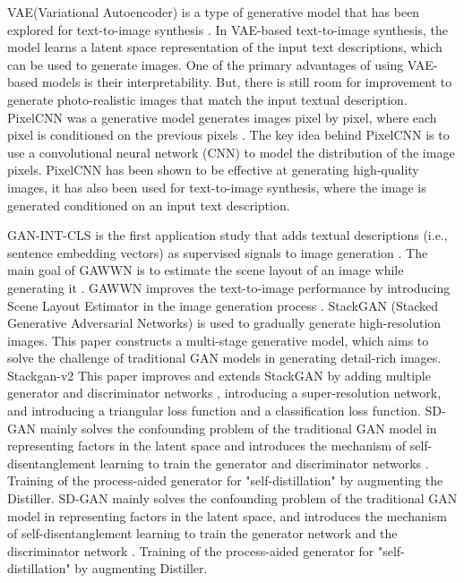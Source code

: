 \documentclass[runningheads, orivec]{llncs}
\begin{document}
VAE(Variational Autoencoder) is a type of generative model that has been explored for text-to-image synthesis \cite{kingma2013auto}. In VAE-based text-to-image synthesis, the model learns a latent space representation of the input text descriptions, which can be used to generate images. One of the primary advantages of using VAE-based models is their interpretability. But, there is still room for improvement to generate photo-realistic images that match the input textual description. PixelCNN was a generative model generates images pixel by pixel, where each pixel is conditioned on the previous pixels \cite{van2016conditional}. The key idea behind PixelCNN is to use a convolutional neural network (CNN) to model the distribution of the image pixels. PixelCNN has been shown to be effective at generating high-quality images, it has also been used for text-to-image synthesis, where the image is generated conditioned on an input text description.

GAN-INT-CLS is the first application study that adds textual descriptions (i.e., sentence embedding vectors) as supervised signals to image generation \cite{reed2016generative}. The main goal of GAWWN is to estimate the scene layout of an image while generating it \cite{reed2016learning}. GAWWN improves the text-to-image performance by introducing Scene Layout Estimator in the image generation process \cite{zhang2017stackgan}. StackGAN (Stacked Generative Adversarial Networks) is used to gradually generate high-resolution images. This paper constructs a multi-stage generative model, which aims to solve the challenge of traditional GAN models in generating detail-rich images. Stackgan-v2 This paper improves and extends StackGAN by adding multiple generator and discriminator networks \cite{zhang2018stackgan++}, introducing a super-resolution network, and introducing a triangular loss function and a classification loss function. SD-GAN mainly solves the confounding problem of the traditional GAN model in representing factors in the latent space and introduces the mechanism of self-disentanglement learning to train the generator and discriminator networks \cite{yin2019semantics}. Training of the process-aided generator for "self-distillation" by augmenting the Distiller. SD-GAN mainly solves the confounding problem of the traditional GAN model in representing factors in the latent space, and introduces the mechanism of self-disentanglement learning to train the generator network and the discriminator network \cite{zhu2019dm}. Training of the process-aided generator for "self-distillation" by augmenting Distiller. 
\vspace{-10pt}
\end{document}
